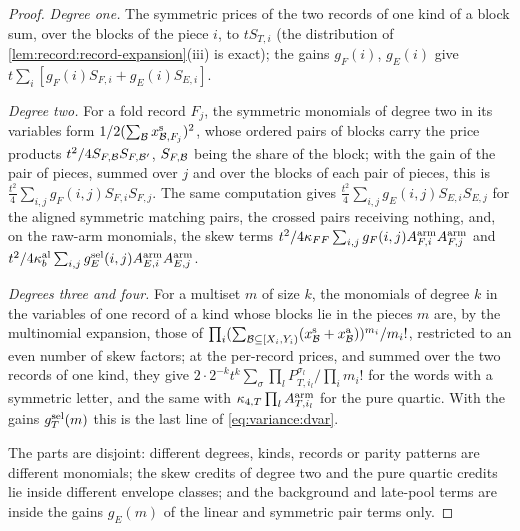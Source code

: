 \begin{proof}
\emph{Degree one.} The symmetric prices of the two records of one kind of a block
sum, over the blocks of the piece $i$, to $tS_{T,i}$ (the distribution of
\cref{lem:record:record-expansion}(iii) is exact); the gains $g_F(i)$,
$g_E(i)$ give $t\sum_i[g_F(i)S_{F,i}+g_E(i)S_{E,i}]$.

\emph{Degree two.} For a fold record $F_j$, the symmetric monomials of degree two
in its variables form $\frac12(\sum_\Blk x^{\rm s}_{\Blk,F_j})^2$, whose ordered pairs
of blocks carry the price products $\frac{t^2}4S_{F,\Blk}S_{F,\Blk'}$, $S_{F,\Blk}$ being
the share of the block; with the gain of the pair of pieces, summed over $j$ and
over the blocks of each pair of pieces, this is
$\frac{t^2}4\sum_{i,j}g_F(i,j)S_{F,i}S_{F,j}$. The same computation gives
$\frac{t^2}4\sum_{i,j}g_E(i,j)S_{E,i}S_{E,j}$ for the aligned symmetric matching
pairs, the crossed pairs receiving nothing, and, on the raw-arm monomials, the
skew terms $\frac{t^2}4\kappa_{FF}\sum_{i,j}g_F(i,j)A^{\rm arm}_{F,i}A^{\rm arm}_{F,j}$ and
$\frac{t^2}4\kappa^{\rm al}_b\sum_{i,j}g^{\rm sel}_E(i,j)A^{\rm arm}_{E,i}A^{\rm arm}_{E,j}$.

\emph{Degrees three and four.} For a multiset $m$ of size $k$, the monomials of
degree $k$ in the variables of one record of a kind whose blocks lie in the pieces
$m$ are, by the multinomial expansion, those of
$\prod_i(\sum_{\Blk\subseteq[X_i,Y_i)}(x^{\rm s}_\Blk+x^{\rm a}_\Blk))^{m_i}/m_i!$, restricted
to an even number of skew factors; at the per-record prices, and summed over the
two records of one kind, they give $2\cdot2^{-k}t^k\sum_\sigma\prod_lP^{\sigma_l}_{T,i_l}
/\prod_im_i!$ for the words with a symmetric letter, and the same with
$\kappa_{4,T}\prod_lA^{\rm arm}_{T,i_l}$ for the pure quartic. With the gains
$g^{\rm sel}_T(m)$ this is the last line of \eqref{eq:variance:dvar}.

The parts are disjoint: different degrees, kinds, records or parity patterns are
different monomials; the skew credits of degree two and the pure quartic credits
lie inside different envelope classes; and the background and late-pool terms are
inside the gains $g_E(m)$ of the linear and symmetric pair terms only.
\end{proof}

